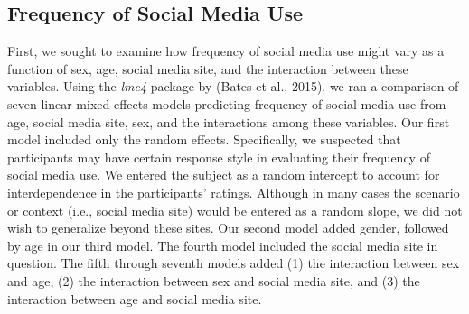 \documentclass[man, fleqn, noextraspace]{apa6}
\theoremstyle{definition}
\theoremstyle{definition}
\theoremstyle{definition}
\theoremstyle{remark}
\begin{document}
\subsection{Frequency of Social Media
Use}\label{frequency-of-social-media-use}

First, we sought to examine how frequency of social media use might vary
as a function of sex, age, social media site, and the interaction
between these variables. Using the \emph{lme4} package by (Bates et al.,
2015), we ran a comparison of seven linear mixed-effects models
predicting frequency of social media use from age, social media site,
sex, and the interactions among these variables. Our first model
included only the random effects. Specifically, we suspected that
participants may have certain response style in evaluating their
frequency of social media use. We entered the subject as a random
intercept to account for interdependence in the participants' ratings.
Although in many cases the scenario or context (i.e., social media site)
would be entered as a random slope, we did not wish to generalize beyond
these sites. Our second model added gender, followed by age in our third
model. The fourth model included the social media site in question. The
fifth through seventh models added (1) the interaction between sex and
age, (2) the interaction between sex and social media site, and (3) the
interaction between age and social media site.
\end{document}
